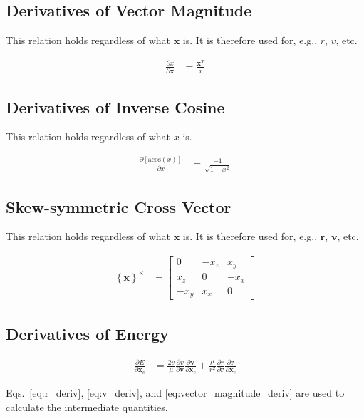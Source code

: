 \documentclass[]{article}
\newcommand{\vb}[1]{\bm{#1}} %
\newcommand{\pd}[2]{\frac{\partial #1}{\partial #2}} %
\newcommand{\crossmat}[1]{\left\{ {#1} \right\}^{\times}} %
\newcommand{\xc}[0]{\vb{x}_c}
\begin{document}
\subsection{Derivatives of Vector Magnitude}

This relation holds regardless of what $\vb{x}$ is. It is therefore used for, e.g., $r$, $v$, etc.

\begin{align}
	\label{eq:vector_magnitude_deriv}
	\pd{x}{\vb{x}} &= \frac{\vb{x}^T}{x}
\end{align}

\subsection{Derivatives of Inverse Cosine}

This relation holds regardless of what $x$ is.

\begin{align}
\label{eq:acos_deriv}
\pd{\left[ \mathrm{acos} \left( x \right) \right]}{x} &= \frac{-1}{\sqrt{1 - x^2}}
\end{align}

\subsection{Skew-symmetric Cross Vector}

This relation holds regardless of what $\vb{x}$ is. It is therefore used for, e.g., $\vb{r}$, $\vb{v}$, etc.

\begin{align}
\label{eq:skewsymmetric}
\crossmat{\vb{x}} &= \left[ \begin{array}{ccc}
0 & -x_z & x_y \\
x_z & 0 & -x_x \\
-x_y & x_x & 0
\end{array} \right]
\end{align}

\subsection{Derivatives of Energy}

\begin{align}
	\label{eq:enery_deriv}
	\pd{E}{\xc} &= \frac{2 v}{\mu} \pd{v}{\vb{v}} \pd{\vb{v}}{\xc} + \frac{\mu}{r^2} \pd{r}{\vb{r}} \pd{\vb{r}}{\xc}
\end{align}

\noindent Eqs.~\eqref{eq:r_deriv}, \eqref{eq:v_deriv}, and \eqref{eq:vector_magnitude_deriv} are used to calculate the intermediate quantities.
\end{document}
